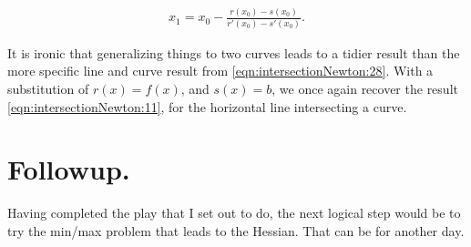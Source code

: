 \begin{align}\label{eqn:intersectionNewton:44}
x_1 = x_0 -
\frac
{
r(x_0) - s(x_0)
}
{
r'(x_0) - s'(x_0) 
}.
\end{align}

It is ironic that generalizing things to two curves leads to a tidier result than the more specific line and curve result from \ref{eqn:intersectionNewton:28}.  With a substitution of $r(x) = f(x)$, and $s(x) = b$, we once again recover the result \ref{eqn:intersectionNewton:11}, for the horizontal line intersecting a curve.

\section{Followup.}

Having completed the play that I set out to do, the next logical step would be to try the min/max problem that leads to the Hessian.  That can be for another day.

\EndNoBibArticle
